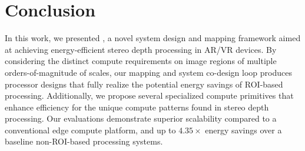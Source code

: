 \section{Conclusion}\label{sec:conclusion}

In this work, we presented \textit{\projname{}}, a novel system design and mapping framework aimed at achieving energy-efficient stereo depth processing in AR/VR devices.
By considering the distinct compute requirements on image regions of multiple orders-of-magnitude of scales, our mapping and system co-design loop produces processor designs that fully realize the potential energy savings of ROI-based processing.
Additionally, we propose several specialized compute primitives that enhance efficiency for the unique compute patterns found in stereo depth processing.
Our evaluations demonstrate superior scalability compared to a conventional edge compute platform, and up to $4.35\times$ energy savings over a baseline non-ROI-based processing systems.